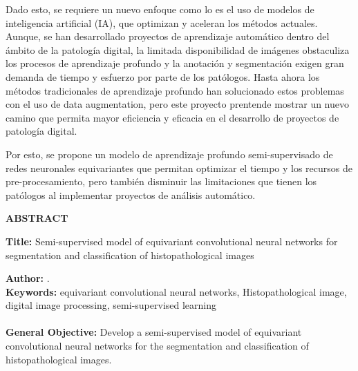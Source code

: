\documentclass[12pt,letterpaper,final, openany]{scrbook}
\begin{document}
Dado esto, se requiere un nuevo enfoque como lo es el uso de modelos de inteligencia artificial (IA), que optimizan y aceleran los métodos actuales. Aunque, se han desarrollado proyectos de aprendizaje automático dentro del ámbito de la patología digital, la limitada disponibilidad de imágenes obstaculiza los procesos de aprendizaje profundo y la anotación y segmentación exigen gran demanda de tiempo y esfuerzo por parte de los patólogos. Hasta ahora los métodos tradicionales de aprendizaje profundo han solucionado estos problemas con el uso de data augmentation, pero este proyecto prentende mostrar un nuevo camino que permita mayor eficiencia y eficacia en el desarrollo de proyectos de patología digital.

Por esto, se propone un modelo de aprendizaje profundo semi-supervisado de redes neuronales equivariantes que permitan optimizar el tiempo y los recursos de pre-procesamiento, pero también disminuir las limitaciones que tienen los patólogos al implementar proyectos de análisis automático. 


 
\vspace*{2cm}


\newpage
{}
\begin{center}
	\Large\textbf{ABSTRACT}\\[20pt]
\end{center}
\textbf{Title:} Semi-supervised model of equivariant convolutional neural networks for segmentation and classification of histopathological images\footnotemark[1]

\vspace*{5mm}

\textbf{Author:} \Author.\footnotemark[2] \\ 

\textbf{Keywords:} equivariant convolutional neural networks, Histopathological image, digital image processing, semi-supervised learning \\	

\\

\textbf{General Objective:}
 Develop a semi-supervised model of equivariant convolutional neural networks for the segmentation and classification of histopathological images.
\end{document}
